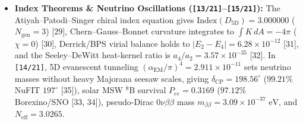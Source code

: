 \documentclass[10pt,a4paper]{article}
\begin{document}
\begin{itemize}
\item \textbf{Index Theorems \& Neutrino Oscillations (\texttt{[13/21]}–\texttt{[15/21]}):} The Atiyah–Patodi–Singer chiral index equation gives $\text{Index}(D_{5\text{D}}) = 3.000000$ ($N_{\text{gen}}=3$) [29], Chern–Gauss–Bonnet curvature integrates to $\int K\,dA = -4\pi$ ($\chi=0$) [30], Derrick/BPS virial balance holds to $|E_2 - E_4| = 6.28 \times 10^{-12}$ [31], and the Seeley–DeWitt heat-kernel ratio is $a_4/a_2 = 3.57 \times 10^{-35}$ [32]. In \texttt{[14/21]}, 5D evanescent tunneling $(\alpha_{\text{EM}}/\pi)^4 = 2.911 \times 10^{-11}$ sets neutrino masses without heavy Majorana seesaw scales, giving $\delta_{\text{CP}} = 198.56^\circ$ ($99.21\%$ NuFIT $197^\circ$ [35]), solar MSW ${}^8\text{B}$ survival $P_{ee} = 0.3169$ ($97.12\%$ Borexino/SNO [33, 34]), pseudo-Dirac $0\nu\beta\beta$ mass $m_{\beta\beta} = 3.09 \times 10^{-37}\text{ eV}$, and $N_{\text{eff}} = 3.0265$.
\end{itemize}
\end{document}
